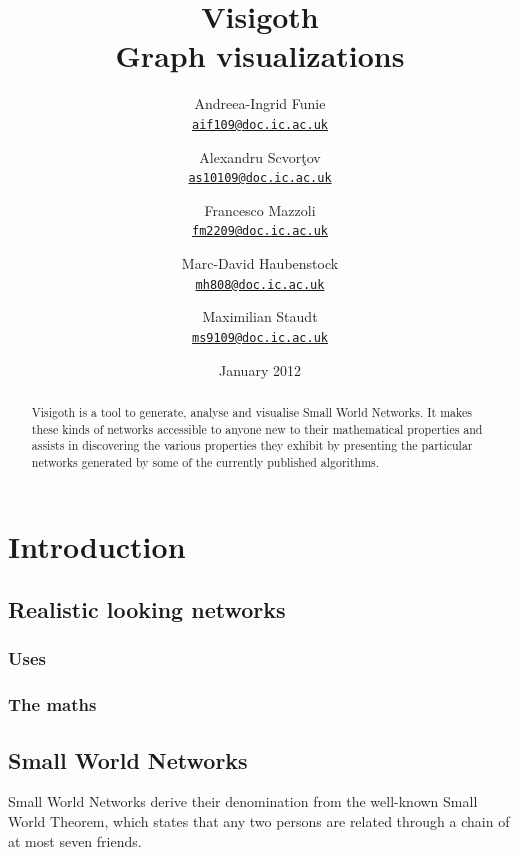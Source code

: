 \documentclass[a4paper,11pt,titlepage]{article}
\newcommand{\mailto}[1]{\href{mailto:#1}{\texttt{#1}}}
\let\stdsection\section         %
\renewcommand{\section}{\newpage\stdsection}
\begin{document}
\title{\Huge Visigoth\\\Large Graph visualizations}
\author{
  Andreea-Ingrid Funie\\\mailto{aif109@doc.ic.ac.uk}\and
  Alexandru Scvor\c tov\\\mailto{as10109@doc.ic.ac.uk}\and
  Francesco Mazzoli\\\mailto{fm2209@doc.ic.ac.uk}\and
  Marc-David Haubenstock\\\mailto{mh808@doc.ic.ac.uk}\and
  Maximilian Staudt\\\mailto{ms9109@doc.ic.ac.uk}
}
\date{January 2012}
\maketitle

\begin{abstract}
Visigoth is a tool to generate, analyse and visualise Small World
Networks.  It makes these kinds of networks accessible to anyone new
to their mathematical properties and assists in discovering the
various properties they exhibit by presenting the particular networks
generated by some of the currently published algorithms.
\end{abstract}

\tableofcontents

\section{Introduction}

\subsection{Realistic looking networks}

\subsubsection{Uses}

\subsubsection{The maths}

\subsection{Small World Networks}

Small World Networks derive their denomination from the well-known
Small World Theorem, which states that any two persons are related
through a chain of at most seven friends.
\end{document}
